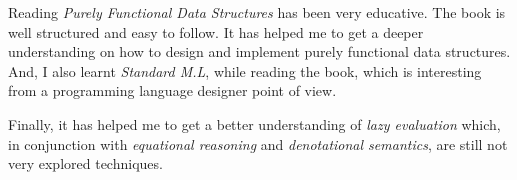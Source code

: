 \documentclass[12pt, a4paper]{article} %
\begin{document}
Reading \textit{Purely Functional Data Structures} has been very educative. The book is well structured and easy to follow. It has helped me to get a deeper understanding on how to design and implement purely functional data structures. And, I also learnt \textit{Standard M.L}, while reading the book, which is interesting from a programming language designer point of view.

Finally, it has helped me to get a better understanding of \textit{lazy evaluation} which, in conjunction with \textit{equational reasoning} and \textit{denotational semantics}, are still not very explored techniques.













\end{document}
